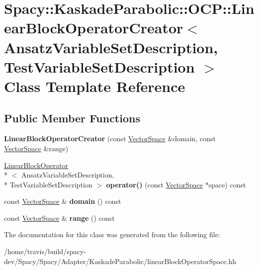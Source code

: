\hypertarget{classSpacy_1_1KaskadeParabolic_1_1OCP_1_1LinearBlockOperatorCreator}{\section{Spacy\-:\-:Kaskade\-Parabolic\-:\-:O\-C\-P\-:\-:Linear\-Block\-Operator\-Creator$<$ Ansatz\-Variable\-Set\-Description, Test\-Variable\-Set\-Description $>$ Class Template Reference}
\label{classSpacy_1_1KaskadeParabolic_1_1OCP_1_1LinearBlockOperatorCreator}
}
\subsection*{Public Member Functions}
\begin{DoxyCompactItemize}
\item 
\hypertarget{classSpacy_1_1KaskadeParabolic_1_1OCP_1_1LinearBlockOperatorCreator_a230cac2f8da6d4a4be42b00d14b03cc9}{{\bfseries Linear\-Block\-Operator\-Creator} (const \hyperlink{classSpacy_1_1VectorSpace}{Vector\-Space} \&domain, const \hyperlink{classSpacy_1_1VectorSpace}{Vector\-Space} \&range)}\label{classSpacy_1_1KaskadeParabolic_1_1OCP_1_1LinearBlockOperatorCreator_a230cac2f8da6d4a4be42b00d14b03cc9}

\item 
\hypertarget{classSpacy_1_1KaskadeParabolic_1_1OCP_1_1LinearBlockOperatorCreator_a46ca5cf529ba5242e197fca2c774d5e7}{\hyperlink{classSpacy_1_1KaskadeParabolic_1_1OCP_1_1LinearBlockOperator}{Linear\-Block\-Operator}\\*
$<$ Ansatz\-Variable\-Set\-Description, \\*
Test\-Variable\-Set\-Description $>$ {\bfseries operator()} (const \hyperlink{classSpacy_1_1VectorSpace}{Vector\-Space} $\ast$space) const }\label{classSpacy_1_1KaskadeParabolic_1_1OCP_1_1LinearBlockOperatorCreator_a46ca5cf529ba5242e197fca2c774d5e7}

\item 
\hypertarget{classSpacy_1_1KaskadeParabolic_1_1OCP_1_1LinearBlockOperatorCreator_a67188ab17414864679dd077f763e9197}{const \hyperlink{classSpacy_1_1VectorSpace}{Vector\-Space} \& {\bfseries domain} () const }\label{classSpacy_1_1KaskadeParabolic_1_1OCP_1_1LinearBlockOperatorCreator_a67188ab17414864679dd077f763e9197}

\item 
\hypertarget{classSpacy_1_1KaskadeParabolic_1_1OCP_1_1LinearBlockOperatorCreator_a494f0abc1b164cce4dfd1ab56105873f}{const \hyperlink{classSpacy_1_1VectorSpace}{Vector\-Space} \& {\bfseries range} () const }\label{classSpacy_1_1KaskadeParabolic_1_1OCP_1_1LinearBlockOperatorCreator_a494f0abc1b164cce4dfd1ab56105873f}

\end{DoxyCompactItemize}


The documentation for this class was generated from the following file\-:\begin{DoxyCompactItemize}
\item 
/home/travis/build/spacy-\/dev/\-Spacy/\-Spacy/\-Adapter/\-Kaskade\-Parabolic/linear\-Block\-Operator\-Space.\-hh\end{DoxyCompactItemize}
